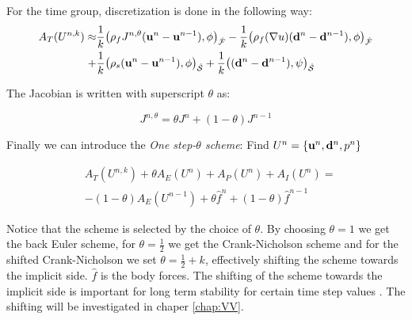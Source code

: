 For the time group, discretization is done in the following way:
\begin{align}
A_T(U^{n,k}) \approx & \frac{1}{k} \big( \rho_f J^{n,\theta} (\bold{u}^n - \bold{u}^{n-1}) , \phi  \big)_{\mathcal{\hat{F}}} - \frac{1}{k} \big( \rho_f (\nabla u ) (\bold{d}^n - \bold{d}^{n-1}) , \phi \big)_{\mathcal{\hat{F}}} \\
+ & \frac{1}{k} \big( \rho_s  (\bold{u}^n - \bold{u}^{n-1}) , \phi  \big)_{\mathcal{\hat{S}}} +  \frac{1}{k} \big( (\bold{d}^n - \bold{d}^{n-1}) , \psi  \big)_{\mathcal{\hat{S}}}
\end{align}

The Jacobian is written with superscript $\theta$ as:

\begin{equation}
J^{n, \theta} = \theta J^n + (1-\theta)J^{n-1}
\end{equation}

Finally we can introduce the \textit{One step-$\theta$ scheme}: 
Find $U^n = \{\bold{u}^n , \bold{d}^n, p^n \}$

\begin{align}
& A_T(U^{n,k}) + \theta A_E(U^{n}) + A_P(U^{n}) + A_I(U^{n}) = \\
& - (1-\theta) A_E(U^{n-1}) + \theta \hat{f}^n + (1-\theta) \hat{f}^{n-1}  
\end{align}

Notice that the scheme is selected by the choice of $\theta $. By choosing $ \theta = 1$ we get the back Euler scheme, for $ \theta = \frac{1}{2}$ we get the Crank-Nicholson scheme and for the shifted Crank-Nicholson we set $ \theta = \frac{1}{2} + k$, effectively shifting the scheme towards the implicit side. $\hat{f}$ is the body forces. The shifting of the scheme towards the implicit side is important for long term stability for certain time step values \cite{Wick2011}. The shifting will be investigated in chaper \ref{chap:VV}.





